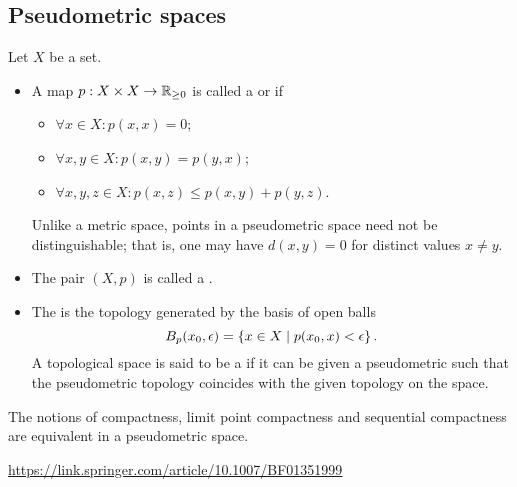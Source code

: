 \subsection{Pseudometric spaces}
\begin{definition}
Let $X$ be a set.
\begin{itemize}
\item A map $p: X\times X\to \mathbb{R}_{\geq 0}$ is called a  or  if
\begin{itemize}
\item $\forall x\in X: p(x,x) = 0$;
\item $\forall x,y\in X: p(x,y) = p(y,x)$;
\item $\forall x,y,z\in X: p(x,z)\leq p(x,y)+p(y,z)$.
\end{itemize}
Unlike a metric space, points in a pseudometric space need not be distinguishable; that is, one may have $d(x,y)=0$ for distinct values $x\neq y$.
\item The pair $(X,p)$ is called a .
\item The  is the topology generated by the basis of open balls
\[ B_p(x_0, \epsilon) = \left\{ x\in X \;\middle|\; p(x_0,x)<\epsilon \right\}. \]
A topological space is said to be a  if it can be given a pseudometric such that the pseudometric topology coincides with the given topology on the space.
\end{itemize}
\end{definition}

\begin{proposition}
The notions of compactness, limit point compactness
and sequential compactness are equivalent in a pseudometric space.
\end{proposition}

\url{https://link.springer.com/article/10.1007/BF01351999}

